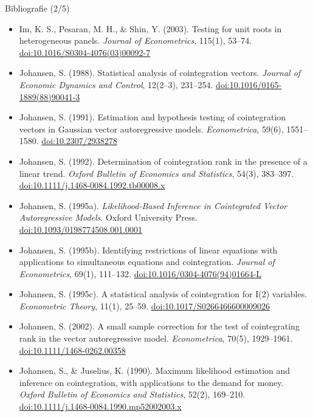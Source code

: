 \begin{frame}{Bibliografie (2/5)}
\itemsize{\tiny}
\begin{itemize}
    \item Im, K. S., Pesaran, M. H., \& Shin, Y. (2003). Testing for unit roots in heterogeneous panels. \textit{Journal of Econometrics}, 115(1), 53--74. \href{https://doi.org/10.1016/S0304-4076(03)00092-7}{doi:10.1016/S0304-4076(03)00092-7}
    \item Johansen, S. (1988). Statistical analysis of cointegration vectors. \textit{Journal of Economic Dynamics and Control}, 12(2--3), 231--254. \href{https://doi.org/10.1016/0165-1889(88)90041-3}{doi:10.1016/0165-1889(88)90041-3}
    \item Johansen, S. (1991). Estimation and hypothesis testing of cointegration vectors in Gaussian vector autoregressive models. \textit{Econometrica}, 59(6), 1551--1580. \href{https://doi.org/10.2307/2938278}{doi:10.2307/2938278}
    \item Johansen, S. (1992). Determination of cointegration rank in the presence of a linear trend. \textit{Oxford Bulletin of Economics and Statistics}, 54(3), 383--397. \href{https://doi.org/10.1111/j.1468-0084.1992.tb00008.x}{doi:10.1111/j.1468-0084.1992.tb00008.x}
    \item Johansen, S. (1995a). \textit{Likelihood-Based Inference in Cointegrated Vector Autoregressive Models}. Oxford University Press. \href{https://doi.org/10.1093/0198774508.001.0001}{doi:10.1093/0198774508.001.0001}
    \item Johansen, S. (1995b). Identifying restrictions of linear equations with applications to simultaneous equations and cointegration. \textit{Journal of Econometrics}, 69(1), 111--132. \href{https://doi.org/10.1016/0304-4076(94)01664-L}{doi:10.1016/0304-4076(94)01664-L}
    \item Johansen, S. (1995c). A statistical analysis of cointegration for I(2) variables. \textit{Econometric Theory}, 11(1), 25--59. \href{https://doi.org/10.1017/S0266466600009026}{doi:10.1017/S0266466600009026}
    \item Johansen, S. (2002). A small sample correction for the test of cointegrating rank in the vector autoregressive model. \textit{Econometrica}, 70(5), 1929--1961. \href{https://doi.org/10.1111/1468-0262.00358}{doi:10.1111/1468-0262.00358}
    \item Johansen, S., \& Juselius, K. (1990). Maximum likelihood estimation and inference on cointegration, with applications to the demand for money. \textit{Oxford Bulletin of Economics and Statistics}, 52(2), 169--210. \href{https://doi.org/10.1111/j.1468-0084.1990.mp52002003.x}{doi:10.1111/j.1468-0084.1990.mp52002003.x}

\end{itemize}
\end{frame}
